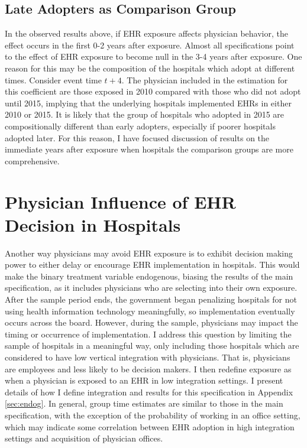 \documentclass[11pt]{article}
\begin{document}
\subsection{Late Adopters as Comparison Group}

In the observed results above, if EHR exposure affects physician behavior, the effect occurs in the first 0-2 years after exposure. Almost all specifications point to the effect of EHR exposure to become null in the 3-4 years after exposure. One reason for this may be the composition of the hospitals which adopt at different times. Consider event time $t+4$. The physician included in the estimation for this coefficient are those exposed in 2010 compared with those who did not adopt until 2015, implying that the underlying hospitals implemented EHRs in either 2010 or 2015. It is likely that the group of hospitals who adopted in 2015 are compositionally different than early adopters, especially if poorer hospitals adopted later. For this reason, I have focused discussion of results on the immediate years after exposure when hospitals the comparison groups are more comprehensive. 


\section{Physician Influence of EHR Decision in Hospitals}

Another way physicians may avoid EHR exposure is to exhibit decision making power to either delay or encourage EHR implementation in hospitals. This would make the binary treatment variable endogenous, biasing the results of the main specification, as it includes physicians who are selecting into their own exposure. After the sample period ends, the government began penalizing hospitals for not using health information technology meaningfully, so implementation eventually occurs across the board. However, during the sample, physicians may impact the timing or occurrence of implementation. I address this question by limiting the sample of hospitals in a meaningful way, only including those hospitals which are considered to have low vertical integration with physicians. That is, physicians are employees and less likely to be decision makers. I then redefine exposure as when a physician is exposed to an EHR in low integration settings. I present details of how I define integration and results for this specification in Appendix \ref{sec:endog}. In general, group time estimates are similar to those in the main specification, with the exception of the probability of working in an office setting, which may indicate some correlation between EHR adoption in high integration settings and acquisition of physician offices. 
\end{document}
